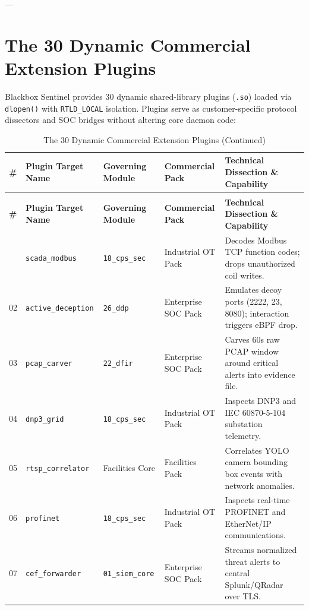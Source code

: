 \documentclass[11pt,a4paper]{article}
\begin{document}
---

\section{The 30 Dynamic Commercial Extension Plugins}
Blackbox Sentinel provides 30 dynamic shared-library plugins (\texttt{.so}) loaded via \texttt{dlopen()} with \texttt{RTLD\_LOCAL} isolation. Plugins serve as customer-specific protocol dissectors and SOC bridges without altering core daemon code:

\setlength{\tabcolsep}{3pt}
\begin{footnotesize}
\begin{longtable}{@{}p{} p{} p{} p{} p{}@{}}
\caption{The 30 Dynamic Commercial Extension Plugins in Blackbox Sentinel} \label{tab:plugins} \\
\toprule
\textbf{\#} & \textbf{Plugin Target Name} & \textbf{Governing Module} & \textbf{Commercial Pack} & \textbf{Technical Dissection \& Capability} \\ \midrule
\endfirsthead
\caption[]{The 30 Dynamic Commercial Extension Plugins (Continued)} \\
\toprule
\textbf{\#} & \textbf{Plugin Target Name} & \textbf{Governing Module} & \textbf{Commercial Pack} & \textbf{Technical Dissection \& Capability} \\ \midrule
\endhead
\bottomrule
\endfoot
01 & \texttt{scada\_modbus} & \texttt{18\_cps\_sec} & Industrial OT Pack & Decodes Modbus TCP function codes; drops unauthorized coil writes. \\
02 & \texttt{active\_deception} & \texttt{26\_ddp} & Enterprise SOC Pack & Emulates decoy ports (2222, 23, 8080); interaction triggers eBPF drop. \\
03 & \texttt{pcap\_carver} & \texttt{22\_dfir} & Enterprise SOC Pack & Carves 60s raw PCAP window around critical alerts into evidence file. \\
04 & \texttt{dnp3\_grid} & \texttt{18\_cps\_sec} & Industrial OT Pack & Inspects DNP3 and IEC 60870-5-104 substation telemetry. \\
05 & \texttt{rtsp\_correlator} & Facilities Core & Facilities Pack & Correlates YOLO camera bounding box events with network anomalies. \\
06 & \texttt{profinet} & \texttt{18\_cps\_sec} & Industrial OT Pack & Inspects real-time PROFINET and EtherNet/IP communications. \\
07 & \texttt{cef\_forwarder} & \texttt{01\_siem\_core} & Enterprise SOC Pack & Streams normalized threat alerts to central Splunk/QRadar over TLS. \\

\end{longtable}
\end{footnotesize}
\end{document}

